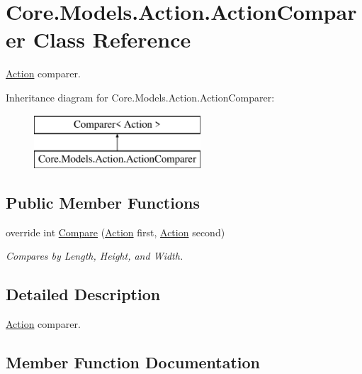 \hypertarget{classCore_1_1Models_1_1Action_1_1ActionComparer}{}\section{Core.\+Models.\+Action.\+Action\+Comparer Class Reference}
\label{classCore_1_1Models_1_1Action_1_1ActionComparer}


\hyperlink{classCore_1_1Models_1_1Action}{Action} comparer.  


Inheritance diagram for Core.\+Models.\+Action.\+Action\+Comparer\+:\begin{figure}[H]
\begin{center}
\leavevmode
\includegraphics[height=2.000000cm]{classCore_1_1Models_1_1Action_1_1ActionComparer}
\end{center}
\end{figure}
\subsection*{Public Member Functions}
\begin{DoxyCompactItemize}
\item 
override int \hyperlink{classCore_1_1Models_1_1Action_1_1ActionComparer_a876fafb59816fb7f9b7c0c35a9312c7a}{Compare} (\hyperlink{classCore_1_1Models_1_1Action}{Action} first, \hyperlink{classCore_1_1Models_1_1Action}{Action} second)
\begin{DoxyCompactList}\small\item\em Compares by Length, Height, and Width. \end{DoxyCompactList}\end{DoxyCompactItemize}


\subsection{Detailed Description}
\hyperlink{classCore_1_1Models_1_1Action}{Action} comparer. 



\subsection{Member Function Documentation}
\hypertarget{classCore_1_1Models_1_1Action_1_1ActionComparer_a876fafb59816fb7f9b7c0c35a9312c7a}{}
